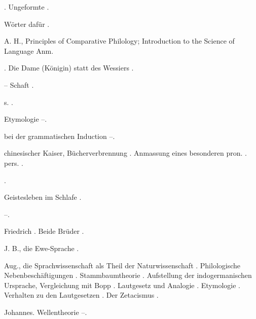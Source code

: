 \begin{register}
 \pageref{sp.81}. Ungeformte \pageref{sp.345}.

 Wörter dafür \pageref{sp.153}.

 A. H., Principles of Comparative Philology; Introduction to the Science of Language \pageref{sp.52} Anm.

. Die Dame (Königin) statt des Wessiers \pageref{sp.268}.

 – Schaft \pageref{sp.267}.

 s. .


 Etymologie \pageref{sp.179}–\pageref{sp.181}.

 bei der grammatischen Induction \pageref{sp.92}–\pageref{sp.93}.

 chinesischer Kaiser, Bücherverbrennung \pageref{sp.19}. Anmassung eines besonderen pron. \pageref{sp.1}. pers. \pageref{sp.230}.

 \pageref{sp.282}.

 Geistesleben im Schlafe \pageref{sp.275}.


 \pageref{sp.234}–\pageref{sp.235}.

 Friedrich \pageref{sp.26}. Beide Brüder \pageref{sp.31}.

 J. B., die Ewe-Sprache \pageref{sp.52}.

 Aug., die Sprachwissenschaft als Theil der Naturwissenschaft \pageref{sp.15}. Philologische Nebenbeschäftigungen \pageref{sp.136}. Stammbaumtheorie \pageref{sp.163}. Aufstellung der indogermanischen Ursprache, Vergleichung mit Bopp \sed{\pageref{sp.164},} \pageref{sp.172}. Lautgesetz und Analogie \pageref{sp.173}. Etymologie \pageref{sp.180}. Verhalten zu den Lautgesetzen \pageref{sp.185}\sed{, \pageref{sp.197}}. Der Zetacismus \pageref{sp.201}.


 Johannes. Wellentheorie \pageref{sp.164}–\pageref{sp.165}\sed{, \pageref{sp.192}}. 


\end{register}
